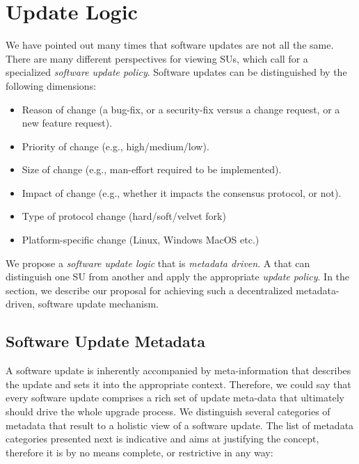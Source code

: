 \section{Update Logic}
We have pointed out many times that software updates are not all the same. There are many different perspectives for viewing SUs, which call for a specialized \emph{software update policy}. Software updates can be distinguished by the following dimensions:
\begin{itemize}
\item Reason of change (a bug-fix, or a security-fix versus a change request, or a new feature request).
\item Priority of change (e.g., high/medium/low).
\item Size of change (e.g., man-effort required to be implemented).
\item Impact of change (e.g., whether it impacts the consensus protocol, or not).
\item Type of protocol change (hard/soft/velvet fork)
\item Platform-specific change (Linux, Windows MacOS etc.)
\end{itemize}
We propose a \emph{software update logic} that is \emph{metadata driven}. A  that can distinguish one SU from another and apply the appropriate \emph{update policy}. In the section, we describe our proposal for achieving such a decentralized metadata-driven, software update mechanism.

\subsection{Software Update Metadata} 
A software update is inherently accompanied by meta-information that describes the update and sets it into the appropriate context. Therefore, we could say that every software update comprises a rich set of update meta-data that ultimately should drive the whole upgrade process. We distinguish several categories of metadata that result to a holistic view of a software update. The list of metadata categories presented next is indicative and aims at justifying the concept, therefore it is by no means complete, or restrictive in any way:
